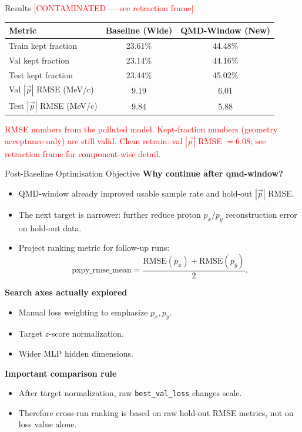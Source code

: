 \documentclass[11pt]{beamer}
\begin{document}
\begin{frame}{Results \textcolor{red}{[CONTAMINATED --- see retraction frame]}}
\begin{table}
\centering
\begin{tabular}{lcc}
\toprule
Metric & Baseline (Wide) & QMD-Window (New) \\
\midrule
Train kept fraction & 23.61\% & 44.48\% \\
Val kept fraction & 23.14\% & 44.16\% \\
Test kept fraction & 23.44\% & 45.02\% \\
Val \(|\vec{p}|\) RMSE (MeV/c) & 9.19 & 6.01 \\
Test \(|\vec{p}|\) RMSE (MeV/c) & 9.84 & 5.88 \\
\bottomrule
\end{tabular}
\end{table}
\footnotesize
\textcolor{red}{RMSE numbers from the polluted model. Kept-fraction numbers
(geometry acceptance only) are still valid. Clean retrain: val \(|\vec p|\) RMSE
\(= 6.08\); see retraction frame for component-wise detail.}
\end{frame}

\begin{frame}{Post-Baseline Optimisation Objective}
\textbf{Why continue after qmd-window?}
\begin{itemize}
\item QMD-window already improved usable sample rate and hold-out \(|\vec{p}|\) RMSE.
\item The next target is narrower: further reduce proton \(p_x/p_y\) reconstruction error on hold-out data.
\item Project ranking metric for follow-up runs:
\[
\mathrm{pxpy\_rmse\_mean}=\frac{\mathrm{RMSE}(p_x)+\mathrm{RMSE}(p_y)}{2}.
\]
\end{itemize}

\textbf{Search axes actually explored}
\begin{itemize}
\item Manual loss weighting to emphasize \(p_x,p_y\).
\item Target \(z\)-score normalization.
\item Wider MLP hidden dimensions.
\end{itemize}

\textbf{Important comparison rule}
\begin{itemize}
\item After target normalization, raw \texttt{best\_val\_loss} changes scale.
\item Therefore cross-run ranking is based on raw hold-out RMSE metrics, not on loss value alone.
\end{itemize}
\end{frame}
\end{document}
